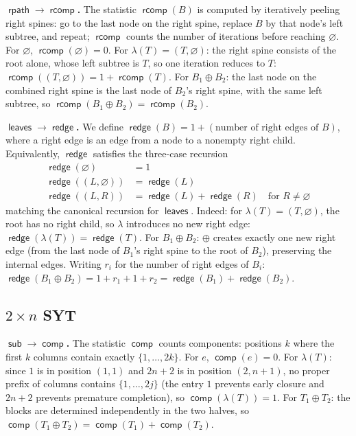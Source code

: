 \documentclass[a4paper,11pt]{article}
\theoremstyle{definition}
\DeclareMathOperator{\comp}{\mathsf{comp}}
\DeclareMathOperator{\rcomp}{\mathsf{rcomp}}
\DeclareMathOperator{\rpath}{\mathsf{rpath}}
\DeclareMathOperator{\leaves}{\mathsf{leaves}}
\DeclareMathOperator{\redge}{\mathsf{redge}}
\DeclareMathOperator{\subtrees}{\mathsf{sub}}
\begin{document}
\textbf{$\boldsymbol{\rpath \to \rcomp}$.}
The statistic $\rcomp(B)$ is computed by iteratively
peeling right spines: go to the last node on the right
spine, replace $B$ by that node's left subtree, and
repeat; $\rcomp$ counts the number of iterations before
reaching $\varnothing$. For $\varnothing$,
$\rcomp(\varnothing) = 0$. For
$\lambda(T) = (T, \varnothing)$: the right spine
consists of the root alone, whose left subtree is $T$,
so one iteration reduces to $T$:
$\rcomp((T, \varnothing)) = 1 + \rcomp(T)$.
For $B_1 \oplus B_2$: the last node on the combined
right spine is the last node of $B_2$'s right spine,
with the same left subtree, so
$\rcomp(B_1 \oplus B_2) = \rcomp(B_2)$.

\textbf{$\boldsymbol{\leaves \to \redge}$.}
We define
$\redge(B) = 1 + (\text{number of right edges of } B)$,
where a right edge is an edge from a node to a nonempty
right child. Equivalently, $\redge$ satisfies the
three-case recursion
\begin{align*}
  \redge(\varnothing) &= 1 \\
  \redge((L, \varnothing)) &= \redge(L) \\
  \redge((L, R)) &= \redge(L) + \redge(R)
    \quad\text{for } R \neq \varnothing
\end{align*}
matching the canonical recursion for $\leaves$.
Indeed: for $\lambda(T) = (T, \varnothing)$, the root has
no right child, so $\lambda$ introduces no new right
edge: $\redge(\lambda(T)) = \redge(T)$. For
$B_1 \oplus B_2$: $\oplus$ creates exactly one new right
edge (from the last node of $B_1$'s right spine to the
root of $B_2$), preserving the internal edges. Writing
$r_i$ for the number of right edges of $B_i$:
$\redge(B_1 \oplus B_2)
= 1 + r_1 + 1 + r_2
= \redge(B_1) + \redge(B_2)$.

\subsection{$2 \times n$ SYT}\label{sec:dict-syt}

\textbf{$\boldsymbol{\subtrees \to \comp}$.}
The statistic $\comp$ counts components:
positions $k$ where the first $k$ columns contain exactly
$\{1, \ldots, 2k\}$. For $e$, $\comp(e) = 0$. For
$\lambda(T)$: since $1$ is in position $(1,1)$ and
$2n{+}2$ is in position $(2,n{+}1)$, no proper prefix
of columns contains $\{1, \ldots, 2j\}$ (the entry $1$
prevents early closure and $2n{+}2$ prevents premature
completion), so $\comp(\lambda(T)) = 1$.
For $T_1 \oplus T_2$: the blocks are determined
independently in the two halves, so
$\comp(T_1 \oplus T_2)
= \comp(T_1) + \comp(T_2)$.
\end{document}
